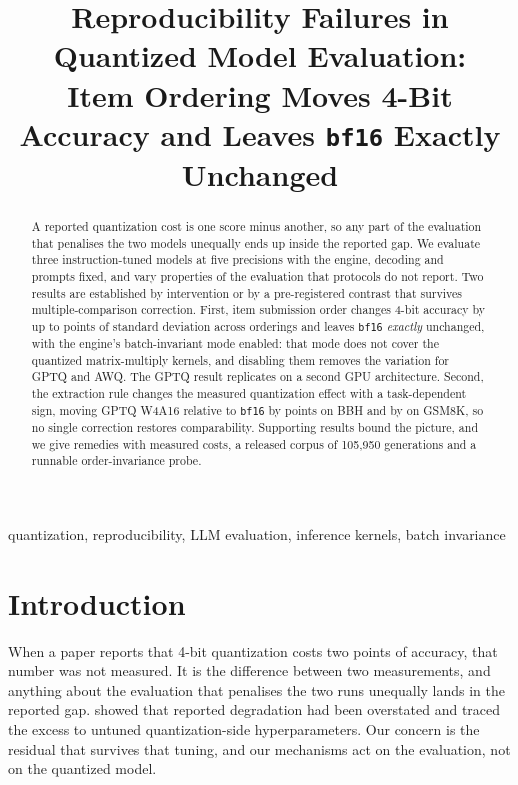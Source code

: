 \documentclass[conference]{IEEEtran}
\title{Reproducibility Failures in Quantized Model Evaluation:\\
Item Ordering Moves 4-Bit Accuracy and Leaves \texttt{bf16} Exactly Unchanged}
\author{%
\IEEEauthorblockN{Joseph Sankoorikal Johny}
\IEEEauthorblockA{Independent Researcher\\Seattle, USA\\\texttt{joseph.sankoorikal@gmail.com}}
\and
\IEEEauthorblockN{Syed Ahmed Danish}
\IEEEauthorblockA{Independent Researcher\\Hartford, USA\\\texttt{syed.danish47@gmail.com}}
\and
\IEEEauthorblockN{Aniruddha Sharma}
\IEEEauthorblockA{Independent Researcher\\Seattle, USA\\\texttt{anirudh217sharma@gmail.com}}}
\begin{document}
\maketitle

\begin{abstract}
A reported quantization cost is one score minus another, so any part of the evaluation that
penalises the two models unequally ends up inside the reported gap. We evaluate three
instruction-tuned models at five precisions with the engine, decoding and prompts fixed,
and vary properties of the evaluation that protocols do not report. Two results are
established by intervention or by a pre-registered contrast that survives multiple-comparison
correction. First, item submission order changes 4-bit accuracy by up to
\hEightWorstSDTen{} points of standard deviation across \hEightSDOrderings{} orderings and
leaves \texttt{bf16} \emph{exactly} unchanged, with the engine's batch-invariant mode
enabled: that mode does not cover the quantized matrix-multiply kernels, and disabling them
removes the variation for GPTQ and AWQ. The GPTQ result replicates on a second GPU
architecture. Second, the extraction rule changes the measured quantization effect with a
task-dependent sign, moving GPTQ W4A16 relative to \texttt{bf16} by \hThreeBbhGptqFour{}
points on BBH and by \hThreeGsmGptqFour{} on GSM8K, so no single correction restores
comparability. Supporting results bound the picture, and we give remedies with measured
costs, a released corpus of 105{,}950 generations and a runnable order-invariance probe.
\end{abstract}

\begin{IEEEkeywords}
quantization, reproducibility, LLM evaluation, inference kernels, batch invariance
\end{IEEEkeywords}

\section{Introduction}
\label{sec:intro}

When a paper reports that 4-bit quantization costs two points of accuracy, that number was
not measured. It is the difference between two measurements, and anything about the
evaluation that penalises the two runs unequally lands in the reported gap.
\citet{kurtic2025bf16} showed that reported degradation had been overstated and traced the
excess to untuned quantization-side hyperparameters. Our concern is the residual that
survives that tuning, and our mechanisms act on the evaluation, not on the quantized model.
\end{document}
